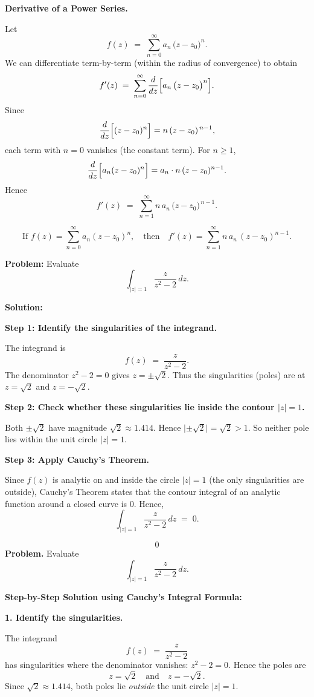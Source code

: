 \documentclass[12pt]{article}
\theoremstyle{definition} %
\theoremstyle{plain} %
\begin{document}
\textbf{Derivative of a Power Series.}

Let 
\[
f(z) \;=\; \sum_{n=0}^{\infty} a_n \,\bigl(z - z_0\bigr)^n.
\]
We can differentiate term-by-term (within the radius of convergence) to obtain
\[
f'(z)
\;=\;
\sum_{n=0}^{\infty} \frac{d}{dz} 
\Bigl[ a_n \,\bigl(z - z_0\bigr)^n \Bigr].
\]
Since
\[
\frac{d}{dz}\Bigl[(z - z_0)^n\Bigr]
=
n\,(z - z_0)^{\,n-1},
\]
each term with \(n=0\) vanishes (the constant term). For \(n \ge 1\),
\[
\frac{d}{dz}\Bigl[a_n (z - z_0)^n\Bigr]
=
a_n \cdot n\, (z - z_0)^{n-1}.
\]
Hence
\[
f'(z)
\;=\;
\sum_{n=1}^{\infty}
n\,a_n\,\bigl(z - z_0\bigr)^{\,n-1}.
\]

\[
\boxed{
\text{If } f(z) = \sum_{n=0}^{\infty} a_n (z - z_0)^n,
\quad\text{then}\quad
f'(z) = \sum_{n=1}^{\infty} n\,a_n \,(z - z_0)^{n-1}.
}
\]

\textbf{Problem:} Evaluate
\[
\int_{\lvert z\rvert = 1} \frac{z}{z^2 - 2}\,dz.
\]

\textbf{Solution:}

\textbf{Step 1: Identify the singularities of the integrand.}

The integrand is 
\[
f(z) \;=\; \frac{z}{z^2 - 2}.
\]
The denominator \(z^2 - 2 = 0\) gives \(z = \pm \sqrt{2}\). Thus the singularities (poles) are at \(z = \sqrt{2}\) and \(z = -\sqrt{2}\).

\textbf{Step 2: Check whether these singularities lie inside the contour \(\lvert z\rvert=1\).}

Both \(\pm \sqrt{2}\) have magnitude \(\sqrt{2}\approx 1.414\). Hence 
\(\lvert \pm \sqrt{2}\rvert = \sqrt{2} > 1.\)
So neither pole lies within the unit circle \(\lvert z\rvert=1\).

\textbf{Step 3: Apply Cauchy's Theorem.}

Since \(f(z)\) is analytic on and inside the circle \(\lvert z\rvert=1\) (the only singularities are outside), Cauchy's Theorem states that the contour integral of an analytic function around a closed curve is \(0\). Hence,
\[
\int_{\lvert z\rvert=1} \frac{z}{z^2 - 2}\,dz
\;=\;
0.
\]

\[
\boxed{0}
\]
\textbf{Problem.} Evaluate
\[
\int_{\lvert z\rvert = 1} \frac{z}{z^2 - 2}\,dz.
\]

\textbf{Step-by-Step Solution using Cauchy’s Integral Formula:}

\textbf{1. Identify the singularities.}

The integrand
\[
f(z) \;=\; \frac{z}{z^2 - 2}
\]
has singularities where the denominator vanishes: \(z^2 - 2 = 0\). Hence the poles are
\[
z = \sqrt{2}
\quad\text{and}\quad
z = -\sqrt{2}.
\]
Since \(\sqrt{2} \approx 1.414\), both poles lie \emph{outside} the unit circle \(\lvert z\rvert=1\).
\end{document}
